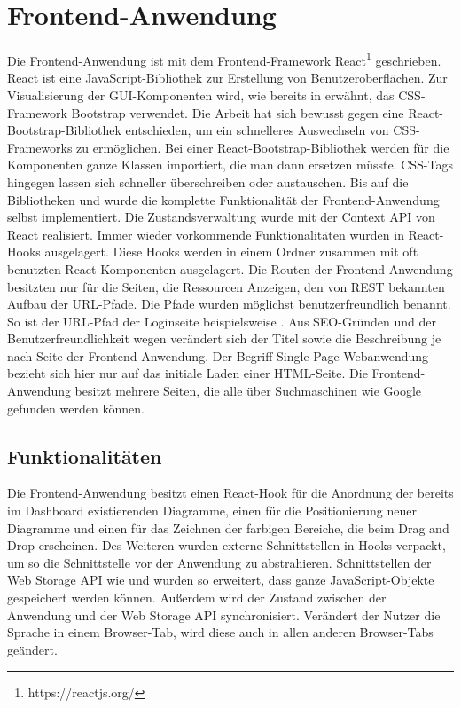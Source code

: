 \section{Frontend-Anwendung}
\label{sec:frontendanwendung}
Die Frontend-Anwendung ist mit dem Frontend-Framework React\footnote{https://reactjs.org/} geschrieben.
React ist eine JavaScript-Bibliothek zur Erstellung von Benutzeroberflächen.
Zur Visualisierung der GUI-Komponenten wird, wie bereits in 
erwähnt, das CSS-Framework Bootstrap verwendet. Die Arbeit hat sich bewusst gegen
eine React-Bootstrap-Bibliothek entschieden, um ein schnelleres Auswechseln von CSS-Frameworks
zu ermöglichen. Bei einer React-Bootstrap-Bibliothek werden für die Komponenten ganze Klassen importiert,
die man dann ersetzen müsste. CSS-Tags hingegen lassen sich schneller überschreiben oder austauschen.
Bis auf die Bibliotheken  und  wurde die komplette Funktionalität der Frontend-Anwendung
selbst implementiert. Die Zustandsverwaltung wurde mit der Context API von React realisiert.
Immer wieder vorkommende Funktionalitäten wurden in React-Hooks ausgelagert. Diese Hooks werden in einem
 Ordner zusammen mit oft benutzten React-Komponenten ausgelagert. Die Routen der Frontend-Anwendung
besitzten nur für die Seiten, die Ressourcen Anzeigen, den von REST bekannten Aufbau der URL-Pfade. Die Pfade
wurden möglichst benutzerfreundlich benannt. So ist der URL-Pfad der Loginseite beispielsweise .
Aus SEO-Gründen und der Benutzerfreundlichkeit wegen verändert sich der Titel sowie die Beschreibung je nach
Seite der Frontend-Anwendung. Der Begriff Single-Page-Webanwendung bezieht sich hier nur auf das initiale Laden
einer HTML-Seite. Die Frontend-Anwendung besitzt mehrere Seiten, die alle über Suchmaschinen wie Google
gefunden werden können.

\subsection{Funktionalitäten}
\label{subsec:funktionalitaeten}
Die Frontend-Anwendung besitzt einen React-Hook für die Anordnung der bereits im Dashboard existierenden Diagramme, einen für
die Positionierung neuer Diagramme und einen für das Zeichnen der farbigen Bereiche, die beim Drag and Drop erscheinen.
Des Weiteren wurden externe Schnittstellen in Hooks verpackt, um so die Schnittstelle vor der Anwendung
zu abstrahieren. Schnittstellen der Web Storage API wie  und 
wurden so erweitert, dass ganze JavaScript-Objekte gespeichert werden können. Außerdem wird der Zustand zwischen
der Anwendung und der Web Storage API synchronisiert. Verändert der Nutzer die Sprache in einem
Browser-Tab, wird diese auch in allen anderen Browser-Tabs geändert.

